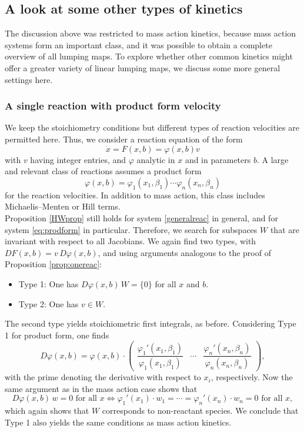\documentclass{article}
\begin{document}
\subsection{A look at some other types of kinetics}
The discussion above was restricted to mass action kinetics, because mass action systems form an important class, and it was possible to obtain a complete overview of all lumping maps. To explore whether other common kinetics might offer a greater variety of linear lumping maps, we discuss some more general settings here.
\subsubsection{A single reaction with product form velocity}
We keep the stoichiometry conditions but different types of reaction velocities are permitted here. Thus, we consider a reaction equation of the form 
\begin{equation}\label{generalreac}
\dot x=F(x,b)=\varphi(x,b) v
\end{equation}
with $v$ having integer entries, and $\varphi$ analytic in $x$ and in parameters $b$. 
A large and relevant class of reactions assumes a product form
\begin{equation}\label{eq:prodform}
    \varphi(x,b)=\varphi_1(x_1,\beta_1)\cdots\varphi_n(x_n,\beta_n)
\end{equation}
for the reaction velocities. In addition to mass action, this class includes Michaelis--Menten or Hill terms.\\
Proposition \ref{HWprop} still holds for system \eqref{generalreac} in general, and for system \eqref{eq:prodform} in particular. Therefore, we search for subspaces $W$ that are invariant with respect to all Jacobians. We again find two types, with $DF(x,b)=v\, D\varphi(x,b)$, and using  arguments analogous to the proof of Proposition \ref{prop:onereac}:
\begin{itemize}
\item Type 1: One has $D\varphi(x,b)\,W=\{0\}$ for all $x$ and $b$.
\item Type 2: One has $v\in W$.
\end{itemize}
The second type yields stoichiometric first integrals, as before. Considering Type 1 for product form, one finds
\[
D\varphi(x,b)=\varphi(x,b)\cdot \begin{pmatrix}\dfrac{\varphi_1'(x_1,\beta_1)}{\varphi_1(x_1,\beta_1)}& \cdots &\dfrac{\varphi_n'(x_n,\beta_n)}{\varphi_n(x_n,\beta_n)}\end{pmatrix},
\]
with the prime denoting the derivative with respect to $x_i$, respectively.
Now the same argument as in the mass action case shows that
\[
D\varphi(x,b)\, w=0 \text{  for all  } x \Longleftrightarrow \varphi_1'(x_1)\cdot w_1=\cdots =\varphi_n'(x_n)\cdot w_n=0 \text{  for all  } x ,
\]
which again shows that $W$ corresponds to non-reactant species. We conclude that Type 1 also yields the same conditions as mass action kinetics.
\end{document}
